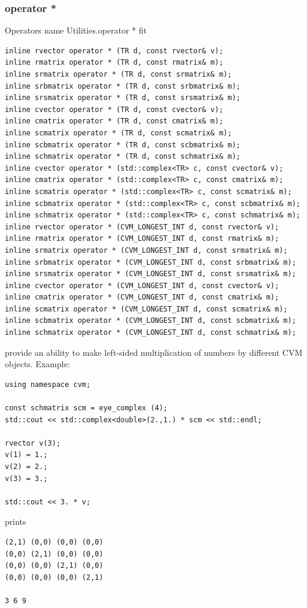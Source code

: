 \subsubsection{operator *}
Operators%
\pdfdest name {Utilities.operator *} fit
\begin{verbatim}
inline rvector operator * (TR d, const rvector& v);
inline rmatrix operator * (TR d, const rmatrix& m);
inline srmatrix operator * (TR d, const srmatrix& m);
inline srbmatrix operator * (TR d, const srbmatrix& m);
inline srsmatrix operator * (TR d, const srsmatrix& m);
inline cvector operator * (TR d, const cvector& v);
inline cmatrix operator * (TR d, const cmatrix& m);
inline scmatrix operator * (TR d, const scmatrix& m);
inline scbmatrix operator * (TR d, const scbmatrix& m);
inline schmatrix operator * (TR d, const schmatrix& m);
inline cvector operator * (std::complex<TR> c, const cvector& v);
inline cmatrix operator * (std::complex<TR> c, const cmatrix& m);
inline scmatrix operator * (std::complex<TR> c, const scmatrix& m);
inline scbmatrix operator * (std::complex<TR> c, const scbmatrix& m);
inline schmatrix operator * (std::complex<TR> c, const schmatrix& m);
inline rvector operator * (CVM_LONGEST_INT d, const rvector& v);
inline rmatrix operator * (CVM_LONGEST_INT d, const rmatrix& m);
inline srmatrix operator * (CVM_LONGEST_INT d, const srmatrix& m);
inline srbmatrix operator * (CVM_LONGEST_INT d, const srbmatrix& m);
inline srsmatrix operator * (CVM_LONGEST_INT d, const srsmatrix& m);
inline cvector operator * (CVM_LONGEST_INT d, const cvector& v);
inline cmatrix operator * (CVM_LONGEST_INT d, const cmatrix& m);
inline scmatrix operator * (CVM_LONGEST_INT d, const scmatrix& m);
inline scbmatrix operator * (CVM_LONGEST_INT d, const scbmatrix& m);
inline schmatrix operator * (CVM_LONGEST_INT d, const schmatrix& m);
\end{verbatim}
provide an ability to make left-sided multiplication of numbers
by different CVM objects.
Example:
\begin{Verbatim}
using namespace cvm;

const schmatrix scm = eye_complex (4);
std::cout << std::complex<double>(2.,1.) * scm << std::endl;

rvector v(3);
v(1) = 1.;
v(2) = 2.;
v(3) = 3.;

std::cout << 3. * v;
\end{Verbatim}
prints
\begin{Verbatim}
(2,1) (0,0) (0,0) (0,0)
(0,0) (2,1) (0,0) (0,0)
(0,0) (0,0) (2,1) (0,0)
(0,0) (0,0) (0,0) (2,1)

3 6 9
\end{Verbatim}
\newpage



